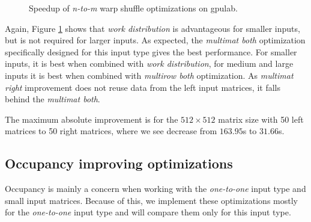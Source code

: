 \begin{figure}[ht]
	\centering	
	\begin{subfigure}{0.49\textwidth}
		\centering
		\def\svgwidth{\textwidth}
		
	\end{subfigure}
	\hfill
	\begin{subfigure}{0.49\textwidth}
		\centering
		\def\svgwidth{\textwidth}
		
	\end{subfigure}
	\hfill
	\begin{subfigure}{0.49\textwidth}
		\centering
		\def\svgwidth{\textwidth}
		
	\end{subfigure}
	
	\caption{Speedup of \textit{n-to-m} warp shuffle optimizations on gpulab.}
	\label{fig:warp_shuffle_n_to_m_results}
\end{figure}

Again, Figure \ref{fig:warp_shuffle_n_to_m_results} shows that \textit{work distribution} is advantageous for smaller inputs, but is not required for larger inputs. As expected, the \textit{multimat both} optimization specifically designed for this input type gives the best performance. For smaller inputs, it is best when combined with \textit{work distribution}, for medium and large inputs it is best when combined with \textit{multirow both} optimization. As \textit{multimat right} improvement does not reuse data from the left input matrices, it falls behind the \textit{multimat both}.

The maximum absolute improvement is for the $512 \times 512$ matrix size with 50 left matrices to 50 right matrices, where we see decrease from $163.95$s to $31.66$s.

\subsection{Occupancy improving optimizations}
\label{sec:results_occupancy_improvements}

Occupancy is mainly a concern when working with the \textit{one-to-one} input type and small input matrices. Because of this, we implement these optimizations mostly for the \textit{one-to-one} input type and will compare them only for this input type. 

